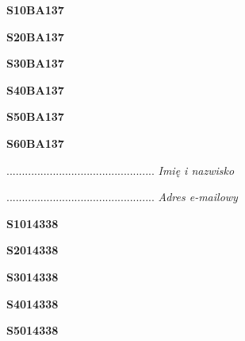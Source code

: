 \begin{turn}{90}\huge \textbf{S10BA137}\end{turn}

\begin{turn}{90}\huge \textbf{S20BA137}\end{turn}

\begin{turn}{90}\huge \textbf{S30BA137}\end{turn}

\begin{turn}{90}\huge \textbf{S40BA137}\end{turn}

\begin{turn}{90}\huge \textbf{S50BA137}\end{turn}

\begin{turn}{90}\huge \textbf{S60BA137}\end{turn}

\begin{turn}{90}\begin{minipage}{\linewidth} \vspace{20mm} ................................................  \textit{Imię i nazwisko}\end{minipage}\end{turn}

\begin{turn}{90}\begin{minipage}{\linewidth} \vspace{20mm} ................................................  \textit{Adres e-mailowy}\end{minipage}\end{turn}

\begin{turn}{90}\huge \textbf{S1014338}\end{turn}

\begin{turn}{90}\huge \textbf{S2014338}\end{turn}

\begin{turn}{90}\huge \textbf{S3014338}\end{turn}

\begin{turn}{90}\huge \textbf{S4014338}\end{turn}

\begin{turn}{90}\huge \textbf{S5014338}\end{turn}

